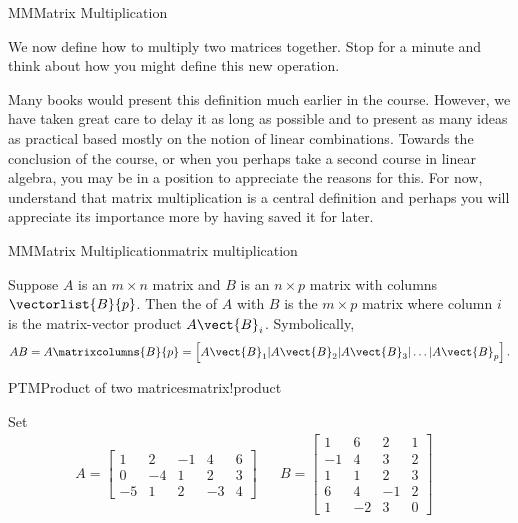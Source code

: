 \begin{subsect}{MM}{Matrix Multiplication}
%
\begin{para}We now define how to multiply two matrices together.  Stop for a minute and think about how you might define this new operation.\end{para}
%
\begin{para}Many books would present this definition much earlier in the course.  However, we have taken great care to delay it as long as possible and to present as many ideas as practical based mostly on the notion of linear combinations.  Towards the conclusion of the course, or when you perhaps take a second course in linear algebra, you may be in a position to appreciate the reasons for this.  For now, understand that matrix multiplication is a central definition and perhaps you will appreciate its importance more by having saved it for later.\end{para}
%
\begin{definition}{MM}{Matrix Multiplication}{matrix multiplication}
\begin{para}Suppose $A$ is an $m\times n$ matrix and $B$ is an $n\times p$ matrix with columns $\vectorlist{B}{p}$.  Then the  of $A$ with $B$ is the $m\times p$ matrix where column $i$ is the matrix-vector product $A\vect{B}_i$.  Symbolically,
%
\begin{equation*}
AB=A\matrixcolumns{B}{p}=\left[A\vect{B}_1|A\vect{B}_2|A\vect{B}_3|\ldots|A\vect{B}_p\right].
\end{equation*}
\end{para}
%
\end{definition}
%
\begin{example}{PTM}{Product of two matrices}{matrix!product}
\begin{para}Set
%
\begin{align*}
A=
\begin{bmatrix}
1 & 2 & -1 & 4 & 6\\
0 & -4 & 1 & 2 & 3\\
-5 & 1 & 2 & -3 & 4
\end{bmatrix}
&&
B=
\begin{bmatrix}
1 & 6 & 2 & 1\\
-1 & 4 & 3 & 2\\
1 & 1 & 2 & 3\\
6 & 4 & -1 & 2\\
1 & -2 & 3 & 0
\end{bmatrix} &
\end{align*}

\end{para}
\end{example}
\end{subsect}

